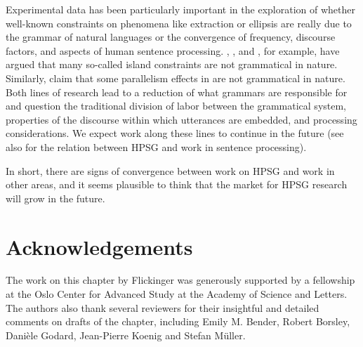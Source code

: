 \documentclass[output=paper
 	        ,biblatex
                ,babelshorthands
                ,newtxmath
                ,draftmode
                ,colorlinks, citecolor=brown
]{langscibook}
\begin{document}
Experimental data has been particularly important in the exploration of whether well-known
constraints on phenomena like extraction or ellipsis are really due to the grammar of natural
languages or the convergence of frequency, discourse factors, and aspects of human sentence
processing. \citet{HS2010a-u}, \citet{CD2019a-u}, and \citet{CP2020a-u}, for
example, have argued that many so-called island constraints are not grammatical in
nature. Similarly, \citet{SAHM2019a-u} claim that some parallelism
effects in  are not grammatical in nature. Both lines of research lead to a
reduction of what grammars are responsible for and question the traditional division of labor
between the grammatical system, properties of the discourse within which utterances are embedded,
and processing considerations. We expect work along these lines to continue in the future (see also
 for the relation between HPSG and work in sentence processing).
 
In short, there are signs of convergence between work on HPSG and work in other areas, and it seems
plausible to think that the market for HPSG research will grow in the future.

\section*{Acknowledgements}

The work on this chapter by Flickinger was generously supported by a fellowship at the Oslo Center for Advanced Study at the  Academy of Science and Letters.  The authors also thank several reviewers for their insightful and detailed comments on drafts of the chapter, including Emily M. Bender, Robert Borsley, Danièle Godard, Jean-Pierre Koenig and Stefan Müller.


{\sloppy
\printbibliography[heading=subbibliography,notkeyword=this]
}
\end{document}

